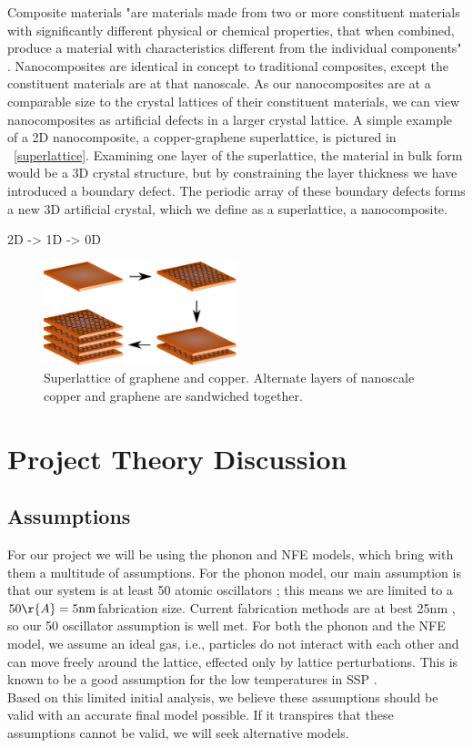 \documentclass[a4paper,12pt]{article}
\newcommand{\figref}[2][\figurename~]{#1\ref{#2}}
\begin{document}
Composite materials "are materials made from two or more constituent
materials with significantly different physical or chemical
properties, that when combined, produce a material with
characteristics different from the individual
components" \cite{wiki-composite}. Nanocomposites are identical in
concept to traditional composites, except the constituent materials
are at that nanoscale. As our nanocomposites are at a comparable size
to the crystal lattices of their constituent materials, we can view
nanocomposites as artificial defects in a larger crystal lattice. A
simple example of a 2D nanocomposite, a copper-graphene superlattice,
is pictured in \figref{superlattice}. Examining one layer of the
superlattice, the material in bulk form would be a 3D crystal structure,
but by constraining the layer thickness we have introduced a boundary
defect. The periodic array of these boundary defects forms a new 3D
artificial crystal, which we define as a superlattice, a nanocomposite.

2D -> 1D -> 0D

\begin{figure}
	\centering
	\includegraphics[width=0.5\textwidth]{graphene-superlattice.eps}
	\caption{Superlattice of graphene and copper. Alternate layers of
	nanoscale copper and graphene are sandwiched together.}
\end{figure}

\section{Project Theory Discussion}
\subsection{Assumptions}
For our project we will be using the phonon and \ac{NFE} models, which
bring with them a multitude of assumptions. For the phonon model, our
main assumption is that our system is at least 50 atomic oscillators
\cite{kittel}; this means we are limited to a $50\r{A} = 5
\mathrm{nm}$fabrication size. Current fabrication methods are at best
25nm \cite{minnch-review}, so our 50 oscillator assumption is well met.
For both the phonon and the \ac{NFE} model, we assume an ideal gas,
i.e., particles do not interact with each other and can move freely
around the lattice, effected only by lattice perturbations. This is
known to be a good assumption for the low temperatures in \ac{SSP}
\cite{kittel}.\\
Based on this limited initial analysis, we believe these assumptions
should be valid with an accurate final model possible. If it transpires
that these assumptions cannot be valid, we will seek alternative models.\\
\end{document}
